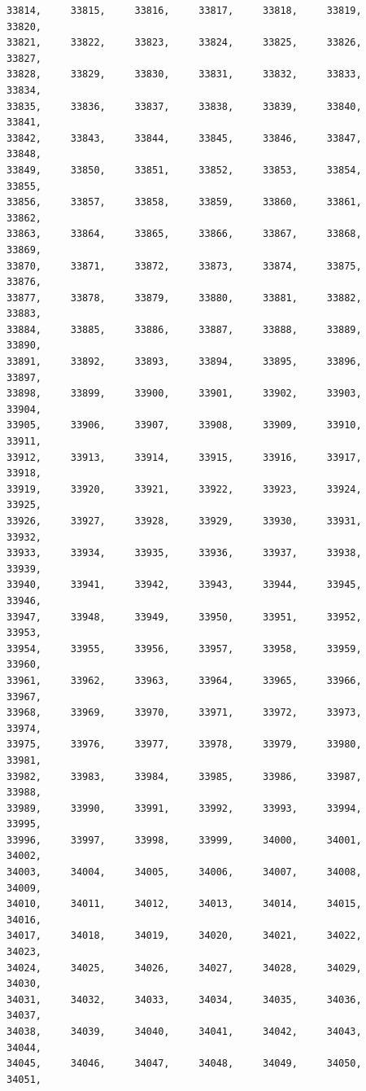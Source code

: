 \documentclass[a4paper,11pt]{report}
\begin{document}
\begin{verbatim}
33814,     33815,     33816,     33817,     33818,     33819,     33820,     
33821,     33822,     33823,     33824,     33825,     33826,     33827,     
33828,     33829,     33830,     33831,     33832,     33833,     33834,     
33835,     33836,     33837,     33838,     33839,     33840,     33841,     
33842,     33843,     33844,     33845,     33846,     33847,     33848,     
33849,     33850,     33851,     33852,     33853,     33854,     33855,     
33856,     33857,     33858,     33859,     33860,     33861,     33862,     
33863,     33864,     33865,     33866,     33867,     33868,     33869,     
33870,     33871,     33872,     33873,     33874,     33875,     33876,     
33877,     33878,     33879,     33880,     33881,     33882,     33883,     
33884,     33885,     33886,     33887,     33888,     33889,     33890,     
33891,     33892,     33893,     33894,     33895,     33896,     33897,     
33898,     33899,     33900,     33901,     33902,     33903,     33904,     
33905,     33906,     33907,     33908,     33909,     33910,     33911,     
33912,     33913,     33914,     33915,     33916,     33917,     33918,     
33919,     33920,     33921,     33922,     33923,     33924,     33925,     
33926,     33927,     33928,     33929,     33930,     33931,     33932,     
33933,     33934,     33935,     33936,     33937,     33938,     33939,     
33940,     33941,     33942,     33943,     33944,     33945,     33946,     
33947,     33948,     33949,     33950,     33951,     33952,     33953,     
33954,     33955,     33956,     33957,     33958,     33959,     33960,     
33961,     33962,     33963,     33964,     33965,     33966,     33967,     
33968,     33969,     33970,     33971,     33972,     33973,     33974,     
33975,     33976,     33977,     33978,     33979,     33980,     33981,     
33982,     33983,     33984,     33985,     33986,     33987,     33988,     
33989,     33990,     33991,     33992,     33993,     33994,     33995,     
33996,     33997,     33998,     33999,     34000,     34001,     34002,     
34003,     34004,     34005,     34006,     34007,     34008,     34009,     
34010,     34011,     34012,     34013,     34014,     34015,     34016,     
34017,     34018,     34019,     34020,     34021,     34022,     34023,     
34024,     34025,     34026,     34027,     34028,     34029,     34030,     
34031,     34032,     34033,     34034,     34035,     34036,     34037,     
34038,     34039,     34040,     34041,     34042,     34043,     34044,     
34045,     34046,     34047,     34048,     34049,     34050,     34051,     

\end{verbatim}
\end{document}
